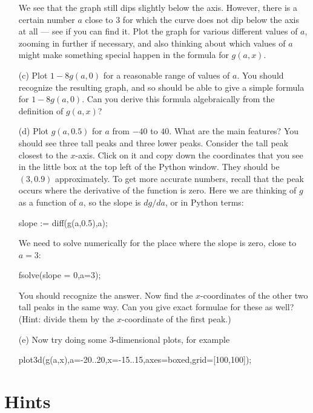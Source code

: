 \documentclass[a4paper,10pt]{amsbook}
\begin{document}
\begin{exercise}
\begin{itemize}
   We see that the graph still dips slightly below the axis.
   However, there is a certain number $a$ close to $3$ for
   which the curve does not dip below the axis at all ---
   see if you can find it.  Plot the graph for various
   different values of $a$, zooming in further if necessary,
   and also thinking about which values of $a$ might make
   something special happen in the formula for $g(a,x)$.
  \item[(c)] Plot $1-8g(a,0)$ for a reasonable range of
   values of $a$.  You should recognize the resulting graph,
   and so should be able to give a simple formula for
   $1-8g(a,0)$.  Can you derive this formula algebraically
   from the definition of $g(a,x)$?
  \item[(d)] Plot $g(a,0.5)$ for $a$ from $-40$ to $40$.
   What are the main features?  You should see three tall
   peaks and three lower peaks.  Consider the tall peak
   closest to the $x$-axis.  Click on it and copy down the
   coordinates that you see in the little box at the top
   left of the Python window.  They should be $(3,0.9)$
   approximately.  To get more accurate numbers, recall that
   the peak occurs where the derivative of the function is
   zero.  Here we are thinking of $g$ as a function of $a$,
   so the slope is $dg/da$, or in Python terms:
\begin{pcodeblock}
    slope := diff(g(a,0.5),a);
\end{pcodeblock}
   We need to solve numerically for the place where the
   slope is zero, close to $a=3$:
\begin{pcodeblock}
    fsolve(slope = 0,a=3);
\end{pcodeblock}
   You should recognize the answer.  Now find the
   $x$-coordinates of the other two tall peaks in the same
   way.  Can you give exact formulae for these as well?
   (Hint: divide them by the $x$-coordinate of the first
   peak.)
  \item[(e)] Now try doing some $3$-dimensional plots, for
   example
\begin{pcodeblock}
   plot3d(g(a,x),a=-20..20,x=-15..15,axes=boxed,grid=[100,100]);
\end{pcodeblock}
 \end{itemize}
\end{exercise}

\section*{Hints}
\end{document}
